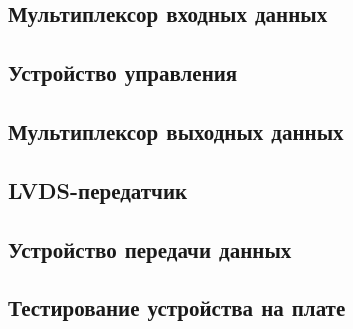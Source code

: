 

\subsection*{Мультиплексор входных данных}



\subsection*{Устройство управления}



\subsection*{Мультиплексор выходных данных}



\newpage

\subsection*{LVDS-передатчик}



\subsection*{Устройство передачи данных}



\subsection*{Тестирование устройства на плате}




